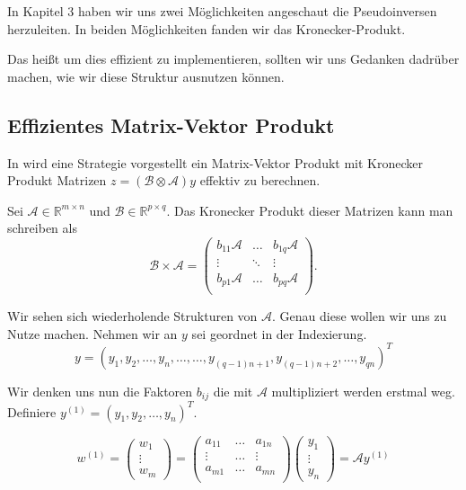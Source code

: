 In Kapitel 3 haben wir uns zwei Möglichkeiten angeschaut die Pseudoinversen herzuleiten. In beiden Möglichkeiten fanden wir das Kronecker-Produkt.

Das heißt um dies effizient zu implementieren, sollten wir uns Gedanken dadrüber machen, wie wir diese Struktur ausnutzen können.

\subsection{Effizientes Matrix-Vektor Produkt }
In \cite{Teachlet} wird eine Strategie vorgestellt ein Matrix-Vektor Produkt mit Kronecker Produkt Matrizen $z=(\mathcal{B} \otimes \mathcal{A})y$ effektiv zu berechnen.

Sei $\mathcal{A} \in \mathbb{R}^{m \times n}$ und $\mathcal{B} \in \mathbb{R}^{p \times q}$. Das Kronecker Produkt dieser Matrizen kann man schreiben als
\begin{equation*}
\mathcal{B} \times \mathcal{A} =
\begin{pmatrix}
b_{11}\mathcal{A} & \dots  & b_{1q}\mathcal{A} \\
\vdots & \ddots & \vdots \\
b_{p1}\mathcal{A} & \dots & b_{pq}\mathcal{A} \\
\end{pmatrix}.
\end{equation*}

Wir sehen sich wiederholende Strukturen von $\mathcal{A}$. Genau diese wollen wir uns zu Nutze machen. Nehmen wir an $y$ sei geordnet in der Indexierung.
\begin{equation*}
y = (y_1,y_2,\dots,y_n,\dots,\dots,y_{(q-1)n+1},y_{(q-1)n+2},\dots,y_{qn})^T
\end{equation*}

Wir denken uns nun die Faktoren $b_{ij}$ die mit $\mathcal{A}$ multipliziert werden erstmal weg. Definiere $y^{(1)}=(y_1,y_2,\dots,y_n)^T$.

\begin{equation*}
w^{(1)}=
\begin{pmatrix}
w_1 \\ \vdots \\ w_m 
\end{pmatrix}
=
\begin{pmatrix}
a_{11} & \dots & a_{1n} \\
\vdots & \dots & \vdots \\
a_{m1} & \dots & a_{mn} \\
\end{pmatrix}
\begin{pmatrix}
y_1 \\ \vdots \\ y_n
\end{pmatrix}
= \mathcal{A}y^{(1)}
\end{equation*}

